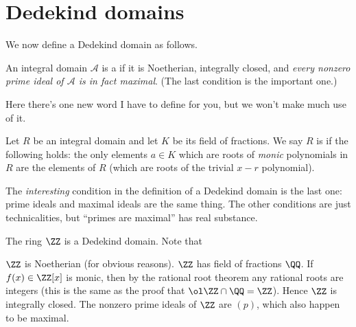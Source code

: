 \section{Dedekind domains}
We now define a Dedekind domain as follows.
\begin{definition}
	An integral domain $\mathcal A$ is a 
	if it is Noetherian, integrally closed, and 
	\emph{every nonzero prime ideal of $\mathcal A$ is in fact maximal}.
	(The last condition is the important one.)
\end{definition}
Here there's one new word I have to define for you, but we won't make much use of it.
\begin{definition}
	Let $R$ be an integral domain and let $K$ be its field of fractions. 
	We say $R$ is  if the following holds:
	the only elements $a \in K$ which are roots of \emph{monic} polynomials in $R$
	are the elements of $R$ (which are roots of the trivial $x-r$ polynomial).
\end{definition}
The \emph{interesting} condition in the definition
of a Dedekind domain is the last one: prime ideals and maximal ideals
are the same thing.
The other conditions are just technicalities, but ``primes are maximal'' has real substance.
\begin{example}
	The ring $\ZZ$ is a Dedekind domain.
	Note that
	\begin{itemize}
		\ii $\ZZ$ is Noetherian (for obvious reasons).
		\ii $\ZZ$ has field of fractions $\QQ$.
		If $f(x) \in \ZZ[x]$ is monic, then by the rational root theorem
		any rational roots are integers (this is the same as the proof that $\ol\ZZ \cap \QQ = \ZZ$).
		Hence $\ZZ$ is integrally closed.
		\ii The nonzero prime ideals of $\ZZ$ are $(p)$, which also happen to be maximal.
	\end{itemize}
\end{example}

